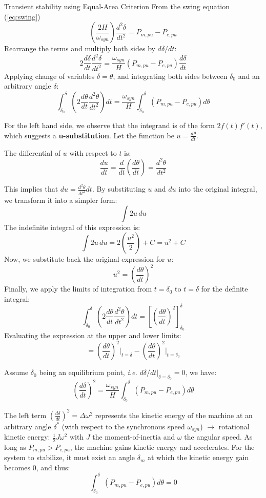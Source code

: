 \begin{frame}[allowframebreaks]{Transient stability using Equal-Area Criterion}
From the swing equation (\ref{eq:swing})
$$\left(\frac{2H}{\omega_{syn}}\right) \frac{d^2\delta}{dt^2} = P_{m,pu} - P_{e,pu}$$
Rearrange the terms and multiply both sides by $d\delta/dt$:
$$2\frac{d\delta}{dt}\frac{d^2\delta}{dt^2} = \frac{\omega_{syn}}{H}\left(P_{m,pu}-P_{e,pu}\right)\frac{d\delta}{dt}$$
Applying change of variables $\delta = \theta$, and integrating both sides between $\delta_0$ and an arbitrary angle $\delta$:
$$\int_{\delta_0}^{\delta} \left(2\frac{d\theta}{dt}\frac{d^2\theta}{dt^2}\right) dt = \frac{\omega_{syn}}{H}\int_{\delta_0}^{\delta} \left(P_{m,pu}-P_{e,pu}\right)d\theta$$


For the left hand side, we observe that the integrand is of the form $2f(t)f'(t)$, which suggests a \textbf{u-substitution}.
Let the function be $u = \frac{d\theta}{dt}$.

The differential of $u$ with respect to $t$ is:
$$ \frac{du}{dt} = \frac{d}{dt}\left(\frac{d\theta}{dt}\right) = \frac{d^2\theta}{dt^2} $$

This implies that $ du = \frac{d^2\theta}{dt^2} dt $.
By substituting $u$ and $du$ into the original integral, we transform it into a simpler form:
$$ \int 2u \, du $$
The indefinite integral of this expression is:
$$ \int 2u \, du = 2\left(\frac{u^2}{2}\right) + C = u^2 + C $$
Now, we substitute back the original expression for $u$:
$$ u^2 = \left(\frac{d\theta}{dt}\right)^2 $$
Finally, we apply the limits of integration from $t = \delta_0$ to $t = \delta$ for the definite integral:
$$ \int_{\delta_0}^{\delta} \left(2\frac{d\theta}{dt}\frac{d^2\theta}{dt^2}\right) dt = \left[\left(\frac{d\theta}{dt}\right)^2\right]_{\delta_0}^{\delta} $$
Evaluating the expression at the upper and lower limits:
$$ = \left(\frac{d\theta}{dt}\right)^2\bigg|_{t=\delta} - \left(\frac{d\theta}{dt}\right)^2\bigg|_{t=\delta_0} $$


Assume $\delta_0$ being an equilibrium point, \emph{i.e.} $d\delta/dt|_{\delta = \delta_0} = 0$, we have:
$$\left(\frac{d\delta}{dt}\right)^2 = \frac{\omega_{syn}}{H}\int_{\delta_0}^{\delta} \left(P_{m,pu}-P_{e,pu}\right) d\theta$$


The left term $\left(\frac{d\delta}{dt}\right)^2 = \Delta\omega^2$ represents the kinetic energy of the machine at an arbitrary angle $\delta^*$ 
(with respect to the synchronous speed $\omega_{syn}$) $\rightarrow$ rotational kinetic energy: $\frac{1}{2} J \omega^2$ with $J$ the moment-of-inertia and $\omega$ the angular speed.
As long as $P_{m,pu} > P_{e,pu}$, the machine gains kinetic energy and accelerates. For the system to stabilize, it must exist an angle $\delta_{m}$ at which the kinetic energy gain becomes 0, and thus:
$$\int_{\delta_0}^{\delta} \left(P_{m,pu}-P_{e,pu}\right) d\theta = 0$$
\end{frame}

